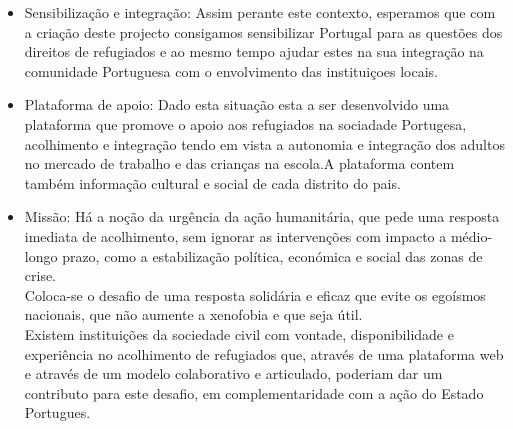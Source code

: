 \documentclass{article}
\begin{document}
\begin{itemize}
    \item Sensibilização e integração: Assim perante este contexto, esperamos que com a criação deste projecto consigamos sensibilizar Portugal para as questões dos direitos de refugiados e ao mesmo tempo ajudar estes na sua integração na comunidade Portuguesa com o envolvimento das instituiçoes locais.
    \item Plataforma de apoio: Dado esta situação esta a ser desenvolvido uma plataforma que promove o apoio aos refugiados na sociadade Portugesa, acolhimento e integração tendo em vista a autonomia e integração dos adultos no mercado de trabalho e das crianças na escola.A plataforma contem também informação cultural e social de cada distrito do pais. 
    \item Missão: Há a noção da urgência da ação humanitária, que pede uma resposta imediata de acolhimento, sem ignorar as intervenções com impacto a médio-longo prazo, como a estabilização política, económica e social das zonas de crise.\\Coloca-se o desafio de uma resposta  solidária e eficaz que evite os egoísmos nacionais, que não aumente a xenofobia e que seja útil.\\Existem instituições da sociedade civil com vontade, disponibilidade e experiência no acolhimento de refugiados que, através de uma plataforma web e através de um modelo colaborativo e articulado, poderiam dar um contributo para este desafio, em complementaridade com a ação do Estado Portugues. 


\end{itemize}

\section{}
\end{document}
